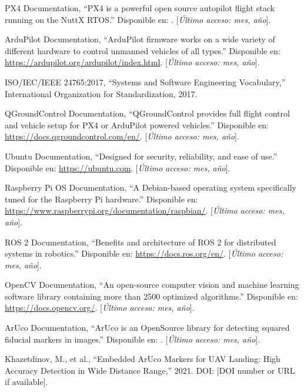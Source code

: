 
\begin{thebibliography}{30}

     PX4 Documentation, ``PX4 is a powerful open source autopilot flight stack running on the NuttX RTOS.'' Disponible en: \url{}. [\textit{Último acceso: mes, año}].

     ArduPilot Documentation, ``ArduPilot firmware works on a wide variety of different hardware to control unmanned vehicles of all types.'' Disponible en: \url{https://ardupilot.org/ardupilot/index.html}. [\textit{Último acceso: mes, año}].

     ISO/IEC/IEEE 24765:2017, ``Systems and Software Engineering Vocabulary,'' International Organization for Standardization, 2017.

     QGroundControl Documentation, ``QGroundControl provides full flight control and vehicle setup for PX4 or ArduPilot powered vehicles.'' Disponible en: \url{https://docs.qgroundcontrol.com/en/}. [\textit{Último acceso: mes, año}].

     Ubuntu Documentation, ``Designed for security, reliability, and ease of use.'' Disponible en: \url{https://ubuntu.com}. [\textit{Último acceso: mes, año}].

     Raspberry Pi OS Documentation, ``A Debian-based operating system specifically tuned for the Raspberry Pi hardware.'' Disponible en: \url{https://www.raspberrypi.org/documentation/raspbian/}. [\textit{Último acceso: mes, año}].

     ROS 2 Documentation, ``Benefits and architecture of ROS 2 for distributed systems in robotics.'' Disponible en: \url{https://docs.ros.org/en/}. [\textit{Último acceso: mes, año}].

     OpenCV Documentation, ``An open-source computer vision and machine learning software library containing more than 2500 optimized algorithms.'' Disponible en: \url{https://docs.opencv.org/}. [\textit{Último acceso: mes, año}].

     ArUco Documentation, ``ArUco is an OpenSource library for detecting squared fiducial markers in images.'' Disponible en: \url{}. [\textit{Último acceso: mes, año}].

     Khazetdinov, M., et al., ``Embedded ArUco Markers for UAV Landing: High Accuracy Detection in Wide Distance Range,'' 2021. DOI: [DOI number or URL if available].


\end{thebibliography}
